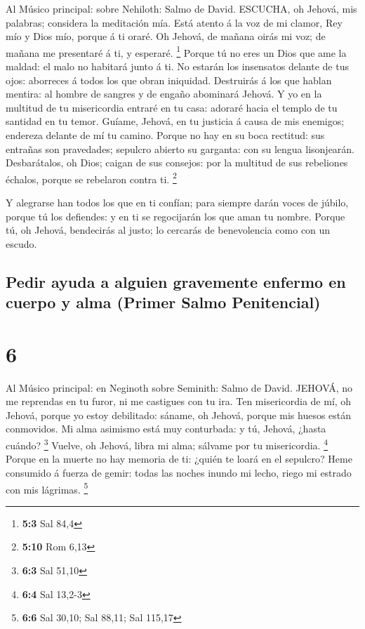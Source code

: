  Al Músico principal: sobre Nehiloth: Salmo de David.
ESCUCHA, oh Jehová, mis palabras; considera la meditación mía.
 Está atento á la voz de mi clamor, Rey mío y Dios mío,
porque á ti oraré.  Oh Jehová, de mañana oirás mi voz; de
mañana me presentaré á ti, y esperaré. \footnote{\textbf{5:3} Sal 84,4}
 Porque tú no eres un Dios que ame la maldad: el malo no
habitará junto á ti.  No estarán los insensatos delante de
tus ojos: aborreces á todos los que obran iniquidad. 
Destruirás á los que hablan mentira: al hombre de sangres y de engaño
abominará Jehová.  Y yo en la multitud de tu misericordia
entraré en tu casa: adoraré hacia el templo de tu santidad en tu temor.
 Guíame, Jehová, en tu justicia á causa de mis enemigos;
endereza delante de mí tu camino.  Porque no hay en su boca
rectitud: sus entrañas son pravedades; sepulcro abierto su garganta: con
su lengua lisonjearán.  Desbarátalos, oh Dios; caigan de
sus consejos: por la multitud de sus rebeliones échalos, porque se
rebelaron contra ti. \footnote{\textbf{5:10} Rom 6,13}

 Y alegrarse han todos los que en ti confían; para siempre
darán voces de júbilo, porque tú los defiendes: y en ti se regocijarán
los que aman tu nombre.  Porque tú, oh Jehová, bendecirás
al justo; lo cercarás de benevolencia como con un escudo.

\hypertarget{pedir-ayuda-a-alguien-gravemente-enfermo-en-cuerpo-y-alma-primer-salmo-penitencial}{%
\subsection{Pedir ayuda a alguien gravemente enfermo en cuerpo y alma
(Primer Salmo
Penitencial)}\label{pedir-ayuda-a-alguien-gravemente-enfermo-en-cuerpo-y-alma-primer-salmo-penitencial}}

\hypertarget{section-5}{%
\section{6}\label{section-5}}

 Al Músico principal: en Neginoth sobre Seminith: Salmo de
David. JEHOVÁ, no me reprendas en tu furor, ni me castigues con tu ira.
 Ten misericordia de mí, oh Jehová, porque yo estoy
debilitado: sáname, oh Jehová, porque mis huesos están conmovidos.
 Mi alma asimismo está muy conturbada: y tú, Jehová, ¿hasta
cuándo? \footnote{\textbf{6:3} Sal 51,10}  Vuelve, oh
Jehová, libra mi alma; sálvame por tu misericordia. \footnote{\textbf{6:4}
  Sal 13,2-3}  Porque en la muerte no hay memoria de ti:
¿quién te loará en el sepulcro?  Heme consumido á fuerza de
gemir: todas las noches inundo mi lecho, riego mi estrado con mis
lágrimas. \footnote{\textbf{6:6} Sal 30,10; Sal 88,11; Sal 115,17}

